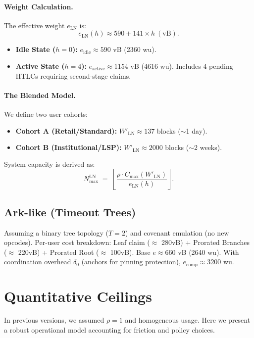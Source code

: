 \documentclass{article}
\theoremstyle{definition}
\begin{document}
\paragraph{Weight Calculation.}
The effective weight $e_{\mathrm{LN}}$ is:
\small
\begin{equation*}
e_{\mathrm{LN}}(h) \approx 590 + 141 \times h \ (\text{vB}).
\end{equation*}
\normalsize
\begin{itemize}
    \item \textbf{Idle State ($h=0$):} $e_{\mathrm{idle}} \approx 590$ vB (2360 wu).
    \item \textbf{Active State ($h=4$):} $e_{\mathrm{active}} \approx 1154$ vB (4616 wu). Includes 4 pending HTLCs requiring second-stage claims.
\end{itemize}

\paragraph{The Blended Model.}
We define two user cohorts:
\begin{itemize}
    \item \textbf{Cohort A (Retail/Standard):} $W'_{\mathrm{LN}} \approx 137$ blocks ($\sim$1 day).
    \item \textbf{Cohort B (Institutional/LSP):} $W'_{\mathrm{LN}} \approx 2000$ blocks ($\sim$2 weeks).
\end{itemize}
System capacity is derived as:
\small
\begin{equation*}
N_{\max}^{\mathrm{LN}} \;=\; \left\lfloor \frac{\rho \cdot C_{\max}(W'_{\mathrm{LN}})}{e_{\mathrm{LN}}(h)}\right\rfloor.\label{eq:nmax}
\end{equation*}
\normalsize

\subsection{Ark-like (Timeout Trees)}
Assuming a binary tree topology ($T=2$) and covenant emulation (no new opcodes). Per-user cost breakdown: Leaf claim ($\approx$ 280vB) + Prorated Branches ($\approx$ 220vB) + Prorated Root ($\approx$ 100vB).
Base $e \approx 660$ vB (2640 wu). With coordination overhead $\delta_0$ (anchors for pinning protection), $e_{\mathrm{comp}} \approx 3200$ wu.

\section{Quantitative Ceilings}
In previous versions, we assumed $\rho=1$ and homogeneous usage. Here we present a robust operational model accounting for friction and policy choices.
\end{document}
